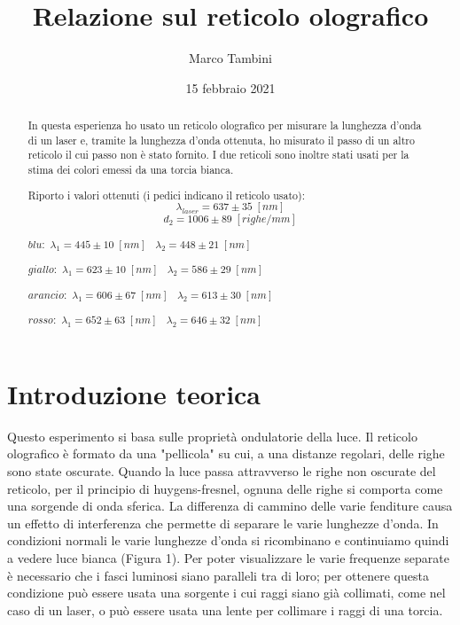\documentclass{article}
\title{Relazione sul reticolo olografico}
\author{Marco Tambini}
\date{15 febbraio 2021}
\begin{document}
\maketitle

\begin{abstract}
In questa esperienza ho usato un reticolo olografico per misurare la lunghezza d'onda di un laser e, tramite la lunghezza d'onda ottenuta, ho misurato il passo di un altro reticolo il cui passo non è stato fornito. I due reticoli sono inoltre stati usati per la stima dei colori emessi da una torcia bianca.

Riporto i valori ottenuti (i pedici indicano il reticolo usato):
\[ \lambda_{laser} = 637 \pm 35 \; [nm] \]
\[ d_2 = 1006 \pm 89 \; [righe / mm] \]

\begin{centering}
$blu:$ \;\;\;\;\;\; $\lambda_1 = 445 \pm 10\; [nm] \;\;\; \lambda_2 = 448 \pm 21\; [nm]$ 

$giallo:$ \;\; $\lambda_1 = 623 \pm 10\; [nm] \;\;\; \lambda_2 = 586 \pm 29\; [nm]$ 

$arancio:$ $\lambda_1 = 606 \pm 67\; [nm] \;\;\; \lambda_2 = 613 \pm 30\; [nm]$ 

$rosso:$ \;\;\; $\lambda_1 = 652 \pm 63\; [nm] \;\;\; \lambda_2 = 646 \pm 32\; [nm]$ 

\end{centering}
\end{abstract}
\tableofcontents

\section{Introduzione teorica}
Questo esperimento si basa sulle proprietà ondulatorie della luce. Il reticolo olografico è formato da una "pellicola" su cui, a una distanze regolari, delle righe sono state oscurate. Quando la luce passa attravverso le righe non oscurate del reticolo, per il principio di huygens-fresnel, ognuna delle righe si comporta come una sorgende di onda sferica. La differenza di cammino delle varie fenditure causa un effetto di interferenza che permette di separare le varie lunghezze d'onda. In condizioni normali le varie lunghezze d'onda si ricombinano e continuiamo quindi a vedere luce bianca (Figura 1). Per poter visualizzare le varie frequenze separate è necessario che i fasci luminosi siano paralleli tra di loro; per ottenere questa condizione può essere usata una sorgente i cui raggi siano già collimati, come nel caso di un laser, o può essere usata una lente per collimare i raggi di una torcia.
\end{document}
